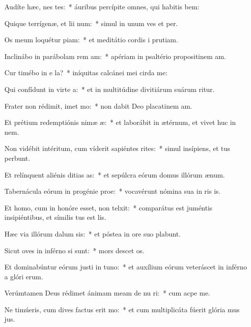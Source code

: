 \item Audíte hæc, nes tes:~* áuribus percípite omnes, qui habitis bem:
\item Quique terrígenæ, et lii num:~* simul in unum ves et per.
\item Os meum loquétur piam:~* et meditátio cordis i prutiam.
\item Inclinábo in parábolam rem am:~* apériam in psaltério propositinem am.
\item Cur timébo in e la?~* iníquitas calcánei mei cirda me:
\item Qui confídunt in virte a:~* et in multitúdine divitiárum suárum ritur.
\item Frater non rédimit, imet mo:~* non dabit Deo placatinem am.
\item Et prétium redemptiónis nimæ æ:~* et laborábit in ætérnum, et vivet huc in nem.
\item Non vidébit intéritum, cum víderit sapiéntes rites:~* simul insípiens, et tus perbunt.
\item Et relínquent aliénis ditias as:~* et sepúlcra eórum domus illórum  ænum.
\item Tabernácula eórum in progénie  proe:~* vocavérunt nómina sua in ris is.
\item Et homo, cum in honóre esset, non telxit:~* comparátus est juméntis insipiéntibus, et símilis tus est lis.
\item Hæc via illórum dalum sis:~* et póstea in ore suo plabunt.
\item Sicut oves in inférno si sunt:~* mors descet os.
\item Et dominabúntur eórum justi in tuno:~* et auxílium eórum veteráscet in inférno a glóri erum.
\item Verúmtamen Deus rédimet ánimam meam de nu ri:~* cum acpe me.
\item Ne timúeris, cum dives factus erit mo:~* et cum multiplicáta fúerit glória mus jus.
